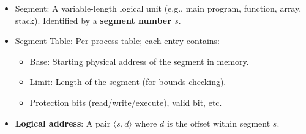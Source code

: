 \documentclass[11pt]{article}
\newcommand{\cle}[1]{{\popxbold\color{popdark}#1}}
\begin{document}
\begin{definition}
\begin{itemize}
    \item \cle{Segment}: A variable-length logical unit (e.g., main program, function, array, stack). Identified by a \textbf{segment number $s$}.
    \item \cle{Segment Table}: Per-process table; each entry contains:
    \begin{itemize}
        \item \cle{Base}: Starting physical address of the segment in memory.
        \item \cle{Limit}: Length of the segment (for bounds checking).
        \item Protection bits (read/write/execute), valid bit, etc.
    \end{itemize}
    \item \textbf{Logical address}: A pair $\langle s, d \rangle$ where $d$ is the offset within segment $s$.
\end{itemize}
\end{definition}
\end{document}
